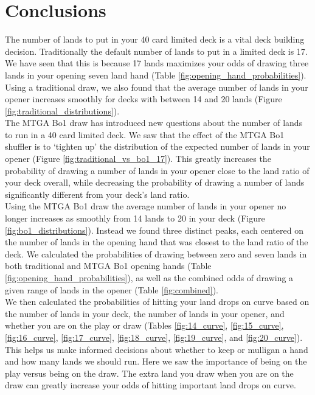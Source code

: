 \documentclass[oneside]{book}   %
\begin{document}
\chapter{Conclusions}

The number of lands to put in your 40 card limited deck is a vital deck building decision. Traditionally the default number of lands to put in a limited deck is 17. We have seen that this is because 17 lands maximizes your odds of drawing three lands in your opening seven land hand (Table \ref{fig:opening_hand_probabilities}). Using a traditional draw, we also found that the average number of lands in your opener increases smoothly for decks with between 14 and 20 lands (Figure \ref{fig:traditional_distributions}).  \\ 

The MTGA Bo1 draw has introduced new questions about the number of lands to run in a 40 card limited deck. We saw that the effect of the MTGA Bo1 shuffler is to `tighten up' the distribution of the expected number of lands in your opener (Figure \ref{fig:traditional_vs_bo1_17}). This greatly increases the probability of drawing a number of lands in your opener close to the land ratio of your deck overall, while decreasing the probability of drawing a number of lands significantly different from your deck's land ratio. \\

Using the MTGA Bo1 draw the average number of lands in your opener no longer increases as smoothly from 14 lands to 20 in your deck (Figure \ref{fig:bo1_distributions}). Instead we found three distinct peaks, each centered on the number of lands in the opening hand that was closest to the land ratio of the deck. We calculated the probabilities of drawing between zero and seven lands in both traditional and MTGA Bo1 opening hands (Table \ref{fig:opening_hand_probabilities}), as well as the combined odds of drawing a given range of lands in the opener (Table \ref{fig:combined}).\\

We then calculated the probabilities of hitting your land drops on curve based on the number of lands in your deck, the number of lands in your opener, and whether you are on the play or draw (Tables \ref{fig:14_curve}, \ref{fig:15_curve}, \ref{fig:16_curve}, \ref{fig:17_curve}, \ref{fig:18_curve}, \ref{fig:19_curve}, and \ref{fig:20_curve}). This helps us make informed decisions about whether to keep or mulligan a hand and how many lands we should run. Here we saw the importance of being on the play versus being on the draw. The extra land you draw when you are on the draw can greatly increase your odds of hitting important land drops on curve. \\
\end{document}
